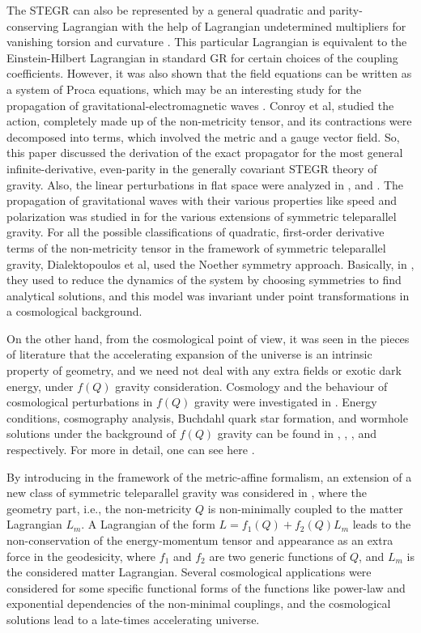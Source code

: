 \documentclass[aps,prd,showpacs,nofootinbib,floats,floatfix,preprintnumbers,groupedaddress,twocolumn]{revtex4-1}
\begin{document}
    The STEGR can also be represented by a general quadratic and parity-conserving Lagrangian with the help of Lagrangian undetermined multipliers for vanishing torsion and curvature \cite{Adak}. This particular Lagrangian is equivalent to the Einstein-Hilbert Lagrangian in standard GR for certain choices of the coupling coefficients. However, it was also shown that the field equations can be written as a system of Proca equations, which may be an interesting study for the propagation of gravitational-electromagnetic waves \cite{Mol}. Conroy et al, \cite{Conroy} studied the action, completely made up of the non-metricity tensor, and its contractions were decomposed into terms, which involved the metric and a gauge vector field. So, this paper \cite{Conroy} discussed the derivation of the exact propagator for the most general infinite-derivative, even-parity in the generally covariant STEGR theory of gravity. Also, the linear perturbations in flat space were analyzed in \cite{Conroy,Kovisto}, and \cite{Beltran}. The propagation of gravitational waves with their various properties like speed and polarization was studied in \cite{Soudi} for the various extensions of symmetric teleparallel gravity. For all the possible classifications of quadratic, first-order derivative terms of the non-metricity tensor in the framework of symmetric teleparallel gravity, Dialektopoulos et al,\cite{Dia} used the Noether symmetry approach. Basically, in \cite{Dia}, they used to reduce the dynamics of the system by choosing symmetries to find analytical solutions, and this model was invariant under point transformations in a cosmological background. 

    On the other hand, from the cosmological point of view, it was seen in the pieces of literature \cite{Lu,Laz} that the accelerating expansion of the universe is an intrinsic property of geometry, and we need not deal with any extra fields or exotic dark energy, under $f(Q)$ gravity consideration. Cosmology and the behaviour of cosmological perturbations in $f(Q)$ gravity were investigated in \cite{Lavi2}. Energy conditions, cosmography analysis, Buchdahl quark star formation, and wormhole solutions under the background of $f(Q)$ gravity can be found in \cite{Sanjay1}, \cite{Sanjay2}, \cite{Sneha}, and \cite{Mustafa1,Hassan1} respectively. For more in detail, one can see here \cite{Raja,De,Raja2,Sanjay3,Sanjay4}.

    By introducing in the framework of the metric-affine formalism, an extension of a new class of symmetric teleparallel gravity was considered in \cite{Harko}, where the geometry part, i.e., the non-metricity $Q$ is non-minimally coupled to the matter Lagrangian $L_{m}$. A Lagrangian of the form $L=f_1(Q)+f_2(Q)L_{m}$ leads to the non-conservation of the energy-momentum tensor and appearance as an extra force in the geodesicity, where $f_1$ and $f_2$ are two generic functions of $Q$, and $L_{m}$ is the considered matter Lagrangian. Several cosmological applications were considered for some specific functional forms of the functions like power-law and exponential dependencies of the non-minimal couplings, and the cosmological solutions lead to a late-times accelerating universe.
\end{document}
